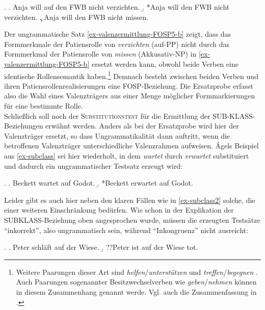 \ex. \label{ex-valenzermittlung-FOSP5}
\a. Anja will auf den FWB nicht verzichten.\label{ex-valenzermittlung-FOSP5-a}
\b. *Anja will den FWB nicht verzichten.\label{ex-valenzermittlung-FOSP5-b}
\c. Anja will den FWB nicht missen.\label{ex-valenzermittlung-FOSP5-c}

Der ungrammatische Satz \ref{ex-valenzermittlung-FOSP5-b} zeigt, dass das Formmerkmale der Patiensrolle von {\it verzichten} (auf-PP) nicht durch das Formmerkmal der Patiensrolle von {\it missen} (Akkusativ-NP) in \ref{ex-valenzermittlung-FOSP5-b}  ersetzt werden kann, obwohl beide Verben eine identische Rollensemantik haben.\footnote{Weitere Paarungen dieser Art sind {\it helfen}/{\it unterstützen} \citep[402]{Mueller:10} und {\it treffen}/{\it begegnen} \citep[126]{Pollard:Sag:87}. Auch Paarungen sogenannter Besitzwechselverben wie {\it geben}/{\it nehmen} \citep[Kapitel~7]{Kunze:91} können in diesem Zusammenhang genannt werde. Vgl. auch die Zusammenfassung in \citet[Abschnitt~11.11.5]{Mueller:10}.} Demnach besteht zwischen beiden Verben und ihren Patiensrollenrealisierungen eine FOSP-Beziehung. Die Ersatzprobe erfasst also die Wahl eines Valenzträgers aus einer Menge möglicher Formmarkierungen für eine bestimmte Rolle.  \\



\label{par-subsitutionstest} Schlie\ss lich soll noch der \textsc{Substitutionstest} für die Ermittlung der SUB-\linebreak KLASS-Beziehun\-gen erwähnt werden. Anders als bei der Ersatzprobe wird hier der Valenzträger ersetzt, so dass Ungrammatikalität dann auftritt, wenn die betroffenen Valenzträger unterschiedliche Valenzrahmen aufweisen. \'Agels Beispiel aus \ref{ex-subclass} sei hier wiederholt, in dem {\it wartet} durch {\it erwartet} substituiert und dadurch ein ungrammatischer Testsatz erzeugt wird: 

\ex. \label{ex-subclass2}
\a. Beckett wartet auf Godot.
\b. *Beckett erwartet auf Godot.

Leider gibt es auch hier neben den klaren Fällen wie in \ref{ex-subclass2} solche, die einer weiteren Einschränkung bedürfen. Wie schon in der Explikation der SUBKLASS-Beziehung oben angesprochen wurde, müssen die erzeugten Testsätze "`inkorrekt"', also ungrammatisch sein, während "`Inkongruenz"' nicht ausreicht:

\ex. 
\a. Peter schläft auf der Wiese.
\b. ??Peter ist auf der Wiese tot.

